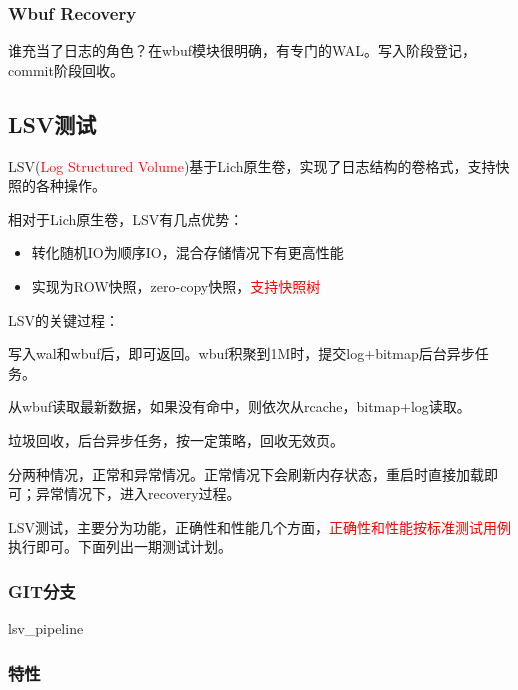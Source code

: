 \documentclass[UTF8]{ctexart}
\begin{document}
\subsubsection{Wbuf Recovery}

谁充当了日志的角色？在wbuf模块很明确，有专门的WAL。写入阶段登记，commit阶段回收。

\subsection{LSV测试}

LSV(\textcolor{red}{Log Structured Volume})基于Lich原生卷，实现了日志结构的卷格式，支持快照的各种操作。

相对于Lich原生卷，LSV有几点优势：
\begin{tcolorbox}
    \begin{itemize}
        \item 转化随机IO为顺序IO，混合存储情况下有更高性能
        \item 实现为ROW快照，zero-copy快照，\textcolor{red}{支持快照树}
    \end{itemize}
\end{tcolorbox}

LSV的关键过程：
\begin{tcolorbox}
    \begin{description}[style=nextline]
        \item [写] 写入wal和wbuf后，即可返回。wbuf积聚到1M时，提交log+bitmap后台异步任务。
        \item [读] 从wbuf读取最新数据，如果没有命中，则依次从rcache，bitmap+log读取。
        \item [GC] 垃圾回收，后台异步任务，按一定策略，回收无效页。
        \item [重启] 分两种情况，正常和异常情况。正常情况下会刷新内存状态，重启时直接加载即可；异常情况下，进入recovery过程。
    \end{description}
\end{tcolorbox}


LSV测试，主要分为功能，正确性和性能几个方面，\textcolor{red}{正确性和性能按标准测试用例}执行即可。下面列出一期测试计划。

\subsubsection{GIT分支}

lsv\_pipeline

\subsubsection{特性}
\end{document}
